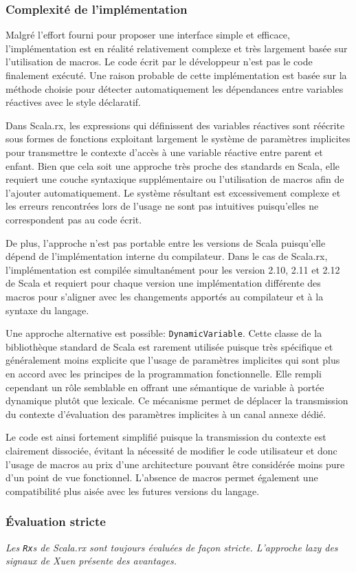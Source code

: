 \subsubsection{Complexité de l'implémentation}
Malgré l'effort fourni pour proposer une interface simple et efficace, l'implémentation est en réalité relativement complexe et très largement basée sur l'utilisation de macros. Le code écrit par le développeur n'est pas le code finalement exécuté. Une raison probable de cette implémentation est basée sur la méthode choisie pour détecter automatiquement les dépendances entre variables réactives avec le style déclaratif.

Dans Scala.rx, les expressions qui définissent des variables réactives sont réécrite sous formes de fonctions exploitant largement le système de paramètres implicites pour transmettre le contexte d'accès à une variable réactive entre parent et enfant. Bien que cela soit une approche très proche des standards en Scala, elle requiert une couche syntaxique supplémentaire ou l'utilisation de macros afin de l'ajouter automatiquement. Le système résultant est excessivement complexe et les erreurs rencontrées lors de l'usage ne sont pas intuitives puisqu'elles ne correspondent pas au code écrit. 

De plus, l'approche n'est pas portable entre les versions de Scala puisqu'elle dépend de l'implémentation interne du compilateur. Dans le cas de Scala.rx, l'implémentation est compilée simultanément pour les version 2.10, 2.11 et 2.12 de Scala et requiert pour chaque version une implémentation différente des macros pour s'aligner avec les changements apportés au compilateur et à la syntaxe du langage.

Une approche alternative est possible: \texttt{DynamicVariable}. Cette classe de la bibliothèque standard de Scala est rarement utilisée puisque très spécifique et généralement moins explicite que l'usage de paramètres implicites qui sont plus en accord avec les principes de la programmation fonctionnelle. Elle rempli cependant un rôle semblable en offrant une sémantique de variable à portée dynamique plutôt que lexicale. Ce mécanisme permet de déplacer la transmission du contexte d'évaluation des paramètres implicites à un canal annexe dédié.

Le code est ainsi fortement simplifié puisque la transmission du contexte est clairement dissociée, évitant la nécessité de modifier le code utilisateur et donc l'usage de macros au prix d'une architecture pouvant être considérée moins pure d'un point de vue fonctionnel. L'absence de macros permet également une compatibilité plus aisée avec les futures versions du langage.

\subsubsection{Évaluation stricte}
\textit{Les \texttt{Rx}s de Scala.rx sont toujours évaluées de façon stricte. L'approche lazy des signaux de Xuen présente des avantages.}